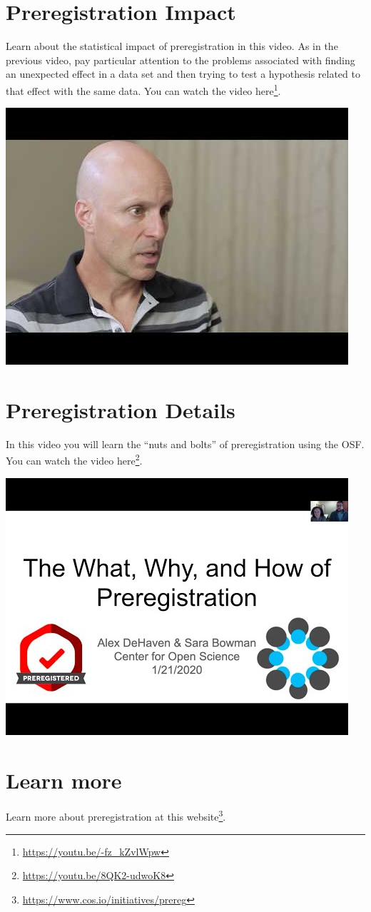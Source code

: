 \documentclass[
]{krantz}
\renewcommand{\href}[2]{#2\footnote{\url{#1}}}
\begin{document}
\hypertarget{preregistration-impact}{%
\section{Preregistration Impact}\label{preregistration-impact}}

Learn about the statistical impact of preregistration in this video. As in the previous video, pay particular attention to the problems associated with finding an unexpected effect in a data set and then trying to test a hypothesis related to that effect with the same data. You can watch the video \href{https://youtu.be/-fz_kZvlWpw}{here}.

\includegraphics[width=0.4\linewidth]{ch_preregistration/images/prereg_impact}

\hypertarget{preregistration-details}{%
\section{Preregistration Details}\label{preregistration-details}}

In this video you will learn the ``nuts and bolts'' of preregistration using the OSF. You can watch the video \href{https://youtu.be/8QK2-udwoK8}{here}.

\includegraphics[width=0.4\linewidth]{ch_preregistration/images/prereg_details}

\hypertarget{learn-more}{%
\section{Learn more}\label{learn-more}}

Learn more about preregistration at this \href{https://www.cos.io/initiatives/prereg}{website}.
\end{document}

